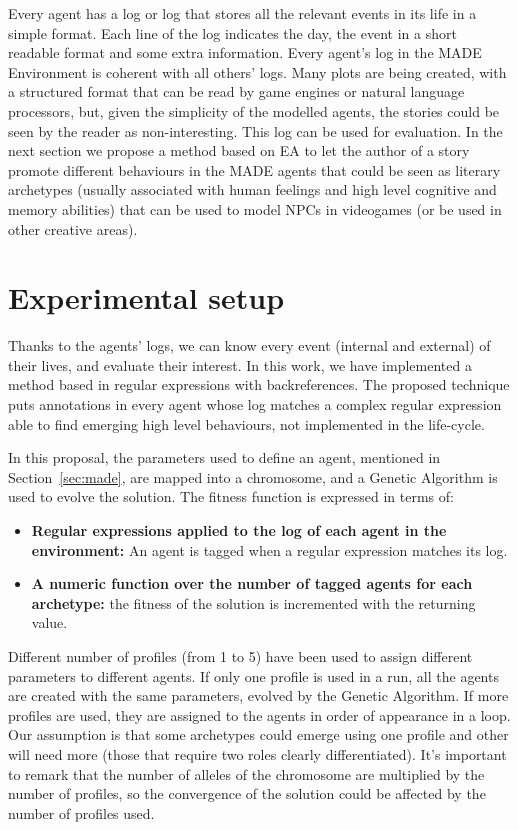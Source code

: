 \documentclass[runningheads]{llncs}
\begin{document}
Every agent has a log or log that stores all the relevant events in its life in a simple format. Each line of the log indicates the day, the event in a short readable format and some extra information. Every agent's log in the MADE Environment is coherent with all others' logs. Many plots are being created, with a structured format that can be read by game engines or natural language processors, but, given the simplicity of the modelled agents, the stories could be seen by the reader as non-interesting. This log can be used for evaluation. In the next section we propose a method based on EA to let the author of a story promote different behaviours in the MADE agents that could be seen as literary archetypes (usually associated with human feelings and high level cognitive and memory abilities) that can be used to model NPCs in videogames (or be used in other creative areas). 


\section{Experimental setup}
\label{sec:experimentalsetup}

Thanks to the agents' logs, we can know every event (internal and external) of their lives, and evaluate their interest. In this work, we have implemented a method based in regular expressions with backreferences. The proposed technique puts annotations in every agent whose log matches a complex regular expression able to find emerging high level behaviours, not implemented in the life-cycle. 

In this proposal, the parameters used to define an agent, mentioned in Section~\ref{sec:made}, are mapped into a chromosome, and a Genetic Algorithm is used to evolve the solution. The fitness function is expressed in terms of:

\begin{itemize}
\item \textbf{Regular expressions applied to the log of each agent in the environment:} An agent is tagged when a regular expression matches its log.
\item \textbf{A numeric function over the number of tagged agents for each archetype:} the fitness of the solution is incremented with the returning value.
\end{itemize}

Different number of profiles (from 1 to 5) have been used to assign different parameters to different agents. If only one profile is used in a run, all the agents are created with the same parameters, evolved by the Genetic Algorithm. If more profiles are used, they are assigned to the agents in order of appearance in a loop. Our assumption is that some archetypes could emerge using one profile and other will need more (those that require two roles clearly differentiated). It's important to remark that the number of alleles of the chromosome are multiplied by the number of profiles, so the convergence of the solution could be affected by the number of profiles used.
\end{document}
